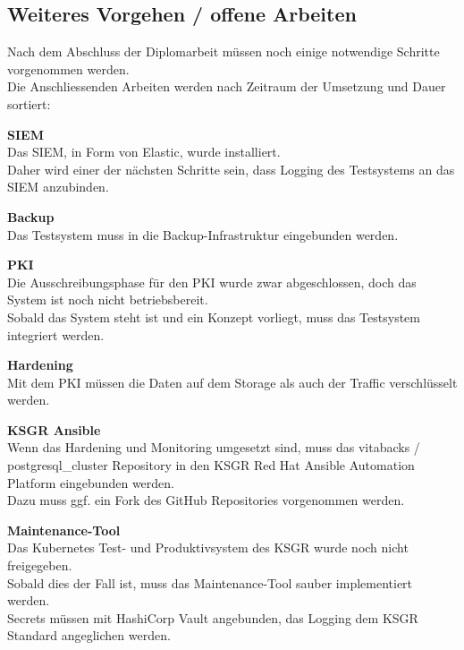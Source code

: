 
\begin{flushleft}
    \section{Weiteres Vorgehen / offene Arbeiten}
    Nach dem Abschluss der Diplomarbeit müssen noch einige notwendige Schritte vorgenommen werden.\\
    Die Anschliessenden Arbeiten werden nach Zeitraum der Umsetzung und Dauer sortiert:
    \begin{description}
        \item \textbf{\Gls{SIEM}}\hfill \\Das \Gls{SIEM}, in Form von Elastic, wurde installiert.\\Daher wird einer der nächsten Schritte sein, dass Logging des Testsystems an das \Gls{SIEM} anzubinden.
        \item \textbf{Backup}\hfill \\Das Testsystem muss in die Backup-Infrastruktur eingebunden werden.
        \item \textbf{\Gls{PKI}}\hfill \\Die Ausschreibungsphase für den \Gls{PKI} wurde zwar abgeschlossen, doch das System ist noch nicht betriebsbereit.\\Sobald das System steht  ist und ein Konzept vorliegt, muss das Testsystem integriert werden.
        \item \textbf{Hardening}\hfill \\Mit dem \Gls{PKI} müssen die Daten auf dem Storage als auch der Traffic verschlüsselt werden.
        \item \textbf{KSGR \Gls{Ansible}}\hfill \\Wenn das Hardening und Monitoring umgesetzt sind, muss das vitabacks / postgresql\_cluster Repository in den KSGR \Gls{Red Hat Ansible Automation Platform} eingebunden werden.\\Dazu muss ggf. ein Fork des  \Gls{GitHub} Repositories vorgenommen werden.
        \item \textbf{Maintenance-Tool}\hfill \\Das \Gls{Kubernetes} Test- und Produktivsystem des KSGR wurde noch nicht freigegeben.\\Sobald dies der Fall ist, muss das Maintenance-Tool sauber implementiert werden.\\Secrets müssen mit HashiCorp Vault\cite{ANQ2ENVU} angebunden, das Logging dem KSGR Standard angeglichen werden.

\end{description}
\end{flushleft}
